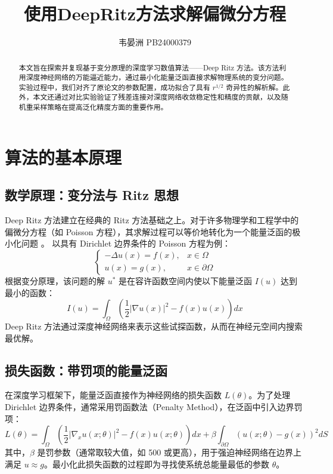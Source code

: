 
\title{\bfseries 使用DeepRitz方法求解偏微分方程}
\author{韦晏洲 \quad PB24000379}


	\maketitle
\begin{abstract}
	本文旨在探索并复现基于变分原理的深度学习数值算法——Deep Ritz 方法。该方法利用深度神经网络的万能逼近能力，通过最小化能量泛函直接求解物理系统的变分问题。
	实验过程中，我们对齐了原论文的参数配置，成功拟合了具有 $r^{1/2}$ 奇异性的解析解。此外，本文还通过对比实验验证了残差连接对深度网络收敛稳定性和精度的贡献，以及随机重采样策略在提高泛化精度方面的重要作用。
\end{abstract}
	\clearpage

	\section{算法的基本原理}
	
	\subsection{数学原理：变分法与 Ritz 思想}
	Deep Ritz 方法建立在经典的 Ritz 方法基础之上。对于许多物理学和工程学中的偏微分方程（如 Poisson 方程），其求解过程可以等价地转化为一个能量泛函的极小化问题 。
	以具有 Dirichlet 边界条件的 Poisson 方程为例：
	\begin{equation}
		\begin{cases}
			-\Delta u(x) = f(x), & x \in \Omega \\
			u(x) = g(x), & x \in \partial\Omega
		\end{cases}
	\end{equation}
	根据变分原理，该问题的解 $u^*$ 是在容许函数空间内使以下能量泛函 $I(u)$ 达到最小的函数：
	\begin{equation}
		I(u) = \int_{\Omega} \left( \frac{1}{2} |\nabla u(x)|^2 - f(x)u(x) \right) dx
	\end{equation}
	Deep Ritz 方法通过深度神经网络来表示这些试探函数，从而在神经元空间内搜索最优解。
	
	\subsection{损失函数：带罚项的能量泛函}
	在深度学习框架下，能量泛函直接作为神经网络的损失函数 $L(\theta)$。为了处理 Dirichlet 边界条件，通常采用罚函数法（Penalty Method），在泛函中引入边界罚项：
	\begin{equation}
		L(\theta) = \int_{\Omega} \left( \frac{1}{2} |\nabla_x u(x; \theta)|^2 - f(x)u(x; \theta) \right) dx + \beta \int_{\partial\Omega} (u(x; \theta) - g(x))^2 dS
	\end{equation}
	其中，$\beta$ 是罚参数（通常取较大值，如 500 或更高），用于强迫神经网络在边界上满足 $u \approx g$。最小化此损失函数的过程即为寻找使系统总能量最低的参数 $\theta$。
	
